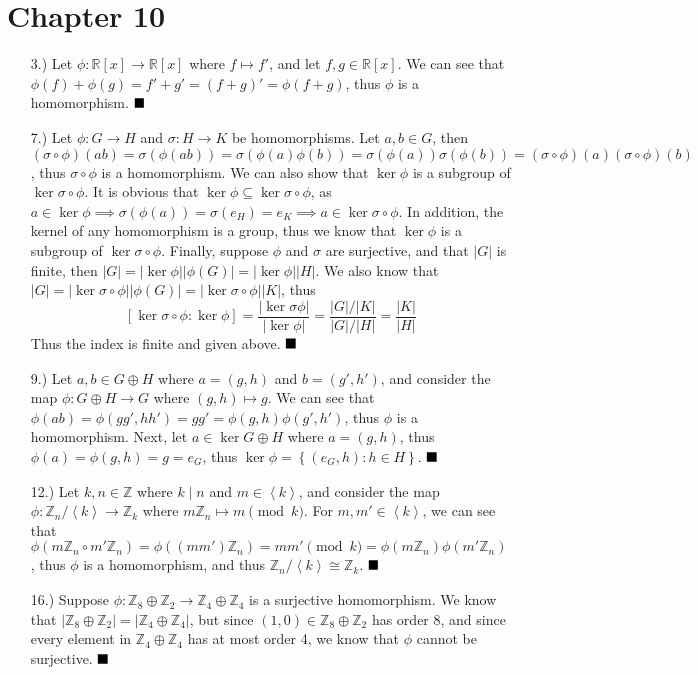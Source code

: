\documentclass[11pt]{article}
\newcommand{\done}{
    \ensuremath{\strut\hfill\blacksquare}
}
\newcommand{\angleb}[1]{\left\langle#1\right\rangle} %
\newcommand{\vertb}[1]{\left\vert#1\right\vert}      %
\newcommand{\braces}[1]{\left\{#1\right\}}           %
\newcommand{\Z}{\mathbb{Z}}
\newcommand{\R}{\mathbb{R}}
\begin{document}
\pagestyle{fancy}
\fancyhead{}

\normalsize

\section*{Chapter 10}
\begin{itemize}
    \item [3.)] Let $\phi:\R[x]\to\R[x]$ where $f\mapsto f'$, and let $f,g\in\R[x]$. We can see that $\phi(f)+\phi(g)=f'+g'=(f+g)'=\phi(f+g)$, thus $\phi$ is a homomorphism. \done

    \item [7.)] Let $\phi:G\to H$ and $\sigma:H\to K$ be homomorphisms. Let $a,b\in G$, then $(\sigma\circ\phi)(ab)=\sigma(\phi(ab))=\sigma(\phi(a)\phi(b))=\sigma(\phi(a))\sigma(\phi(b))=(\sigma\circ\phi)(a)(\sigma\circ\phi)(b)$, thus $\sigma\circ\phi$ is a homomorphism. We can also show that $\ker\phi$ is a subgroup of $\ker\sigma\circ\phi$. It is obvious that $\ker\phi\subseteq\ker\sigma\circ\phi$, as $a\in\ker\phi\implies\sigma(\phi(a))=\sigma(e_H)=e_K\implies a\in\ker\sigma\circ\phi$. In addition, the kernel of any homomorphism is a group, thus we know that $\ker\phi$ is a subgroup of $\ker\sigma\circ\phi$. Finally, suppose $\phi$ and $\sigma$ are surjective, and that $\vertb{G}$ is finite, then $\vertb{G}=\vertb{\ker\phi}\vertb{\phi(G)}=\vertb{\ker\phi}\vertb{H}$. We also know that $\vertb{G}=\vertb{\ker\sigma\circ\phi}\vertb{\phi(G)}=\vertb{\ker\sigma\circ\phi}\vertb{K}$, thus
    \[[\ker\sigma\circ\phi:\ker\phi]=\frac{\vertb{\ker\sigma\phi}}{\vertb{\ker\phi}}=\frac{\vertb{G}/\vertb{K}}{\vertb{G}/\vertb{H}}=\frac{\vertb{K}}{\vertb{H}}\]
    Thus the index is finite and given above. \done

    \item [9.)] Let $a,b\in G\oplus H$ where $a=(g,h)$ and $b=(g',h')$, and consider the map $\phi:G\oplus H\to G$ where $(g,h)\mapsto g$. We can see that $\phi(ab)=\phi(gg',hh')=gg'=\phi(g,h)\phi(g',h')$, thus $\phi$ is a homomorphism. Next, let $a\in\ker G\oplus H$ where $a=(g,h)$, thus $\phi(a)=\phi(g,h)=g=e_G$, thus $\ker\phi=\braces{(e_G,h):h\in H}$. \done

    \item [12.)] Let $k,n\in\Z$ where $k\mid n$ and $m\in\angleb{k}$, and consider the map $\phi:\Z_n/\angleb{k}\to\Z_k$ where $m\Z_n\mapsto m\pmod{k}$. For $m,m'\in\angleb{k}$, we can see that $\phi(m\Z_n\circ m'\Z_n)=\phi((mm')\Z_n)=mm'\pmod{k}=\phi(m\Z_n)\phi(m'\Z_n)$, thus $\phi$ is a homomorphism, and thus $\Z_n/\angleb{k}\cong\Z_k$. \done

    \item [16.)] Suppose $\phi:\Z_8\oplus\Z_2\to\Z_4\oplus\Z_4$ is a surjective homomorphism. We know that $\vertb{\Z_8\oplus\Z_2}=\vertb{\Z_4\oplus\Z_4}$, but since $(1,0)\in\Z_8\oplus\Z_2$ has order 8, and since every element in $\Z_4\oplus\Z_4$ has at most order 4, we know that $\phi$ cannot be surjective. \done
\end{itemize}
\end{document}
